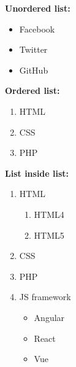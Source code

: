 \documentclass{article}
\begin{document}
	\textbf{Unordered list:} %
	\begin{itemize} %
		\item Facebook
		\item Twitter
		\item GitHub
	\end{itemize}
	
	\textbf{Ordered list:}
	\begin{enumerate} %
		\item HTML
		\item CSS
		\item PHP
	\end{enumerate}
	
	\textbf{List inside list:}
	\begin{enumerate} %
		\item HTML
			\begin{enumerate}
				\item HTML4
				\item HTML5
			\end{enumerate}
		\item CSS
		\item PHP
		\item JS framework
			\begin{itemize}
				\item Angular
				\item React
				\item Vue
			\end{itemize}
	\end{enumerate}
	
\end{document}
